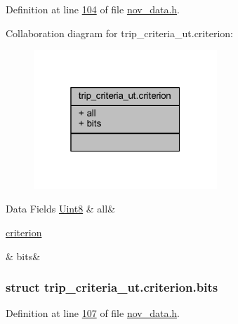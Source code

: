 Definition at line \hyperlink{a00022_source_l00104}{104} of file \hyperlink{a00022_source}{nov\+\_\+data.\+h}.



Collaboration diagram for trip\+\_\+criteria\+\_\+ut.\+criterion\+:\nopagebreak
\begin{figure}[H]
\begin{center}
\leavevmode
\includegraphics[width=196pt]{da/deb/a00985}
\end{center}
\end{figure}
\begin{DoxyFields}{Data Fields}
\hypertarget{a00022_aa181a603769c1f98ad927e7367c7aa51}{\hyperlink{a00072_af84840501dec18061d18a68c162a8fa2}{Uint8}}\label{a00022_aa181a603769c1f98ad927e7367c7aa51}
&
all&
\\
\hline

\hypertarget{a00022_acc411e6c13670e52124629b8ac83f7d0}{\hyperlink{a00022_d0/d08/a00832}{criterion}}\label{a00022_acc411e6c13670e52124629b8ac83f7d0}
&
bits&
\\
\hline

\end{DoxyFields}
\label{d0/d08/a00832}
\hypertarget{a00022_d0/d08/a00832}{}
\subsubsection{struct trip\+\_\+criteria\+\_\+ut.\+criterion.\+bits}


Definition at line \hyperlink{a00022_source_l00107}{107} of file \hyperlink{a00022_source}{nov\+\_\+data.\+h}.



